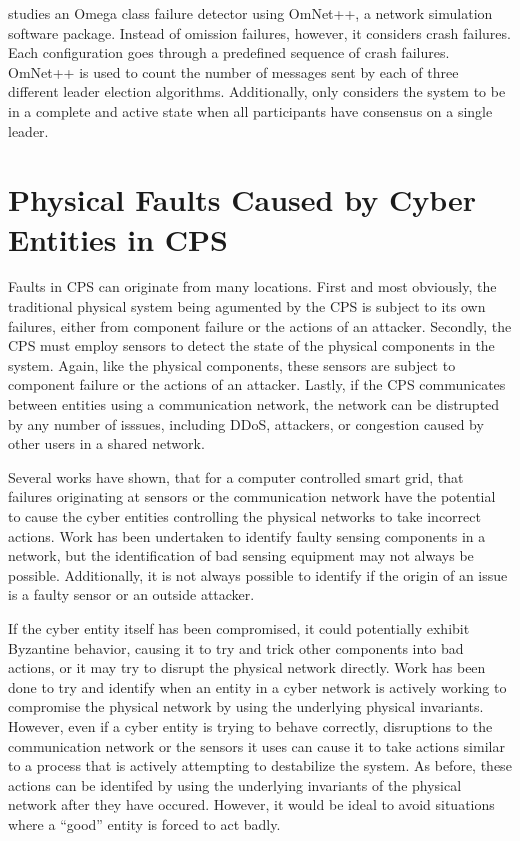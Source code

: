 \cite{LEADERELECTIONEVAL} studies an Omega class failure detector using OmNet++\cite{OMNET}, a network simulation software package. Instead of omission failures, however, it considers crash failures. Each configuration goes through a predefined sequence of crash failures. OmNet++ is used to count the number of messages sent by each of three different leader election algorithms. Additionally, \cite{LEADERELECTIONEVAL} only considers the system to be in a complete and active state when all participants have consensus on a single leader.

\section{Physical Faults Caused by Cyber Entities in CPS}

Faults in \ac{CPS} can originate from many locations.
First and most obviously, the traditional physical system being agumented by the CPS is subject to its own failures, either from component failure or the actions of an attacker.
Secondly, the \ac{CPS} must employ sensors to detect the state of the physical components in the system.
Again, like the physical components, these sensors are subject to component failure or the actions of an attacker.
Lastly, if the \ac{CPS} communicates between entities using a communication network, the network can be distrupted by any number of isssues, including DDoS, attackers, or congestion caused by other users in a shared network.

Several works have shown, that for a computer controlled smart grid, that failures originating at sensors or the communication network have the potential to cause the cyber entities controlling the physical networks to take incorrect actions.
Work has been undertaken to identify faulty sensing components in a network, but the identification of bad sensing equipment may not always be possible.
Additionally, it is not always possible to identify if the origin of an issue is a faulty sensor or an outside attacker.

If the cyber entity itself has been compromised, it could potentially exhibit Byzantine behavior, causing it to try and trick other components into bad actions, or it may try to disrupt the physical network directly.
Work has been done to try and identify when an entity in a cyber network is actively working to compromise the physical network by using the underlying physical invariants.
However, even if a cyber entity is trying to behave correctly, disruptions to the communication network or the sensors it uses can cause it to take actions similar to a process that is actively attempting to destabilize the system.
As before, these actions can be identifed by using the underlying invariants of the physical network after they have occured.
However, it would be ideal to avoid situations where a ``good'' entity is forced to act badly.

